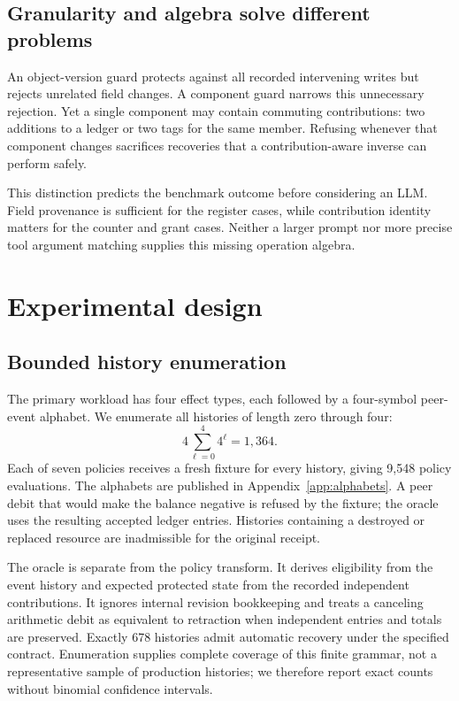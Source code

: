\documentclass[10pt,twocolumn]{article}
\begin{document}
\subsection{Granularity and algebra solve different problems}
An object-version guard protects against all recorded intervening writes but rejects unrelated field changes. A component guard narrows this unnecessary rejection. Yet a single component may contain commuting contributions: two additions to a ledger or two tags for the same member. Refusing whenever that component changes sacrifices recoveries that a contribution-aware inverse can perform safely.

This distinction predicts the benchmark outcome before considering an LLM. Field provenance is sufficient for the register cases, while contribution identity matters for the counter and grant cases. Neither a larger prompt nor more precise tool argument matching supplies this missing operation algebra.

\section{Experimental design}
\subsection{Bounded history enumeration}
The primary workload has four effect types, each followed by a four-symbol peer-event alphabet. We enumerate all histories of length zero through four:
\begin{equation}
 4\sum_{\ell=0}^{4}4^{\ell}=1{,}364.
\end{equation}
Each of seven policies receives a fresh fixture for every history, giving 9,548 policy evaluations. The alphabets are published in Appendix~\ref{app:alphabets}. A peer debit that would make the balance negative is refused by the fixture; the oracle uses the resulting accepted ledger entries. Histories containing a destroyed or replaced resource are inadmissible for the original receipt.

The oracle is separate from the policy transform. It derives eligibility from the event history and expected protected state from the recorded independent contributions. It ignores internal revision bookkeeping and treats a canceling arithmetic debit as equivalent to retraction when independent entries and totals are preserved. Exactly 678 histories admit automatic recovery under the specified contract. Enumeration supplies complete coverage of this finite grammar, not a representative sample of production histories; we therefore report exact counts without binomial confidence intervals.
\end{document}
